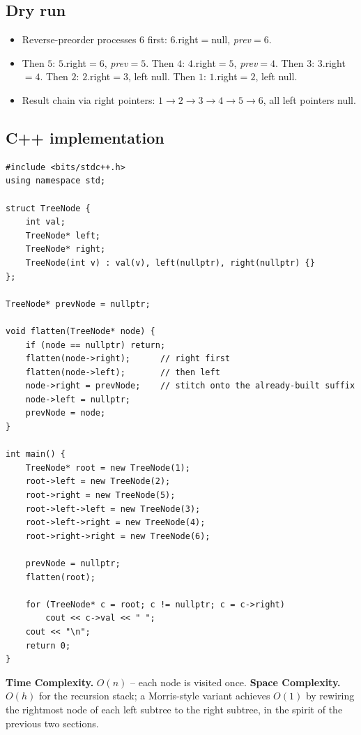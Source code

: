 \subsection*{Dry run}


\begin{itemize}
  \item Reverse-preorder processes $6$ first: $6$.right$=$null,
        \textit{prev}$=6$.
  \item Then $5$: $5$.right$=6$, \textit{prev}$=5$. Then $4$:
        $4$.right$=5$, \textit{prev}$=4$. Then $3$: $3$.right$=4$. Then
        $2$: $2$.right$=3$, left null. Then $1$: $1$.right$=2$, left null.
  \item Result chain via right pointers: $1\!\to\!2\!\to\!3\!\to\!4\!\to
        \!5\!\to\!6$, all left pointers null.
\end{itemize}

\subsection*{C++ implementation}

\begin{lstlisting}
#include <bits/stdc++.h>
using namespace std;

struct TreeNode {
    int val;
    TreeNode* left;
    TreeNode* right;
    TreeNode(int v) : val(v), left(nullptr), right(nullptr) {}
};

TreeNode* prevNode = nullptr;

void flatten(TreeNode* node) {
    if (node == nullptr) return;
    flatten(node->right);      // right first
    flatten(node->left);       // then left
    node->right = prevNode;    // stitch onto the already-built suffix
    node->left = nullptr;
    prevNode = node;
}

int main() {
    TreeNode* root = new TreeNode(1);
    root->left = new TreeNode(2);
    root->right = new TreeNode(5);
    root->left->left = new TreeNode(3);
    root->left->right = new TreeNode(4);
    root->right->right = new TreeNode(6);

    prevNode = nullptr;
    flatten(root);

    for (TreeNode* c = root; c != nullptr; c = c->right)
        cout << c->val << " ";
    cout << "\n";
    return 0;
}
\end{lstlisting}

\begin{complexitybox}
\textbf{Time Complexity.} $O(n)$ -- each node is visited once.
\textbf{Space Complexity.} $O(h)$ for the recursion stack; a Morris-style
variant achieves $O(1)$ by rewiring the rightmost node of each left subtree
to the right subtree, in the spirit of the previous two sections.
\end{complexitybox}

